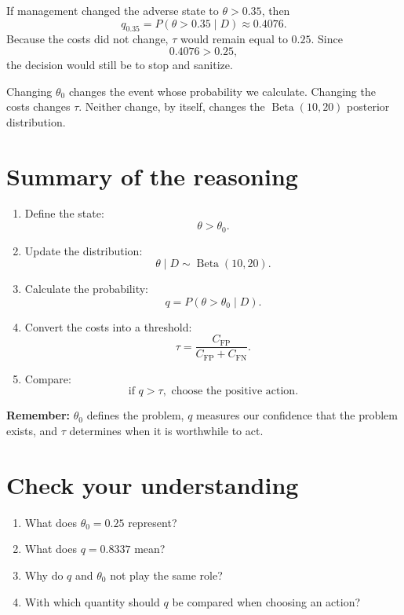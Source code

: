 \documentclass[11pt,letter]{article}
\newcommand{\CFP}{C_{\mathrm{FP}}}
\newcommand{\CFN}{C_{\mathrm{FN}}}
\begin{document}
If management changed the adverse state to $\theta>0.35$, then
\[
q_{0.35}=P(\theta>0.35\mid D)\approx0.4076.
\]
Because the costs did not change, $\tau$ would remain equal to $0.25$. Since
\[
0.4076>0.25,
\]
the decision would still be to stop and sanitize.

\begin{atencao}
Changing $\theta_0$ changes the event whose probability we calculate. Changing
the costs changes $\tau$. Neither change, by itself, changes the
$\operatorname{Beta}(10,20)$ posterior distribution.
\end{atencao}

\section{Summary of the reasoning}

\begin{enumerate}
  \item Define the state:
        \[
        \theta>\theta_0.
        \]

  \item Update the distribution:
        \[
        \theta\mid D\sim\operatorname{Beta}(10,20).
        \]

  \item Calculate the probability:
        \[
        q=P(\theta>\theta_0\mid D).
        \]

  \item Convert the costs into a threshold:
        \[
        \tau=\frac{\CFP}{\CFP+\CFN}.
        \]

  \item Compare:
        \[
        \text{if }q>\tau,\text{ choose the positive action.}
        \]
\end{enumerate}

\begin{ideia}
\textbf{Remember:} $\theta_0$ defines the problem, $q$ measures our
confidence that the problem exists, and $\tau$ determines when it is worthwhile
to act.
\end{ideia}

\section{Check your understanding}

\begin{enumerate}
  \item What does $\theta_0=0.25$ represent?
  \item What does $q=0.8337$ mean?
  \item Why do $q$ and $\theta_0$ not play the same role?
  \item With which quantity should $q$ be compared when choosing an action?
\end{enumerate}
\end{document}
